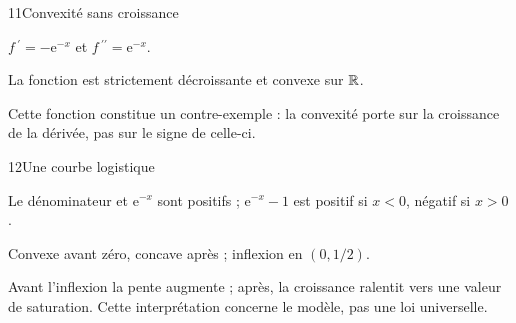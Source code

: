 \begin{corrige}{11}{Convexité sans croissance}
\begin{questions}
\item $f\,\!^{\prime}=-\mathrm e^{-x}$ et $f\,\!^{\prime\prime}=\mathrm e^{-x}$.
\item La fonction est strictement décroissante et convexe sur $\mathbb{R}$.
\item Cette fonction constitue un contre-exemple : la convexité porte sur la croissance de la dérivée, pas sur le signe de celle-ci.
\end{questions}
\end{corrige}
\begin{corrige}{12}{Une courbe logistique}
\begin{questions}
\item Le dénominateur et $\mathrm e^{-x}$ sont positifs ; $\mathrm e^{-x}-1$ est positif si $x<0$, négatif si $x>0$.
\item Convexe avant zéro, concave après ; inflexion en $(0,1/2)$.
\item Avant l’inflexion la pente augmente ; après, la croissance ralentit vers une valeur de saturation. Cette interprétation concerne le modèle, pas une loi universelle.
\end{questions}
\end{corrige}
